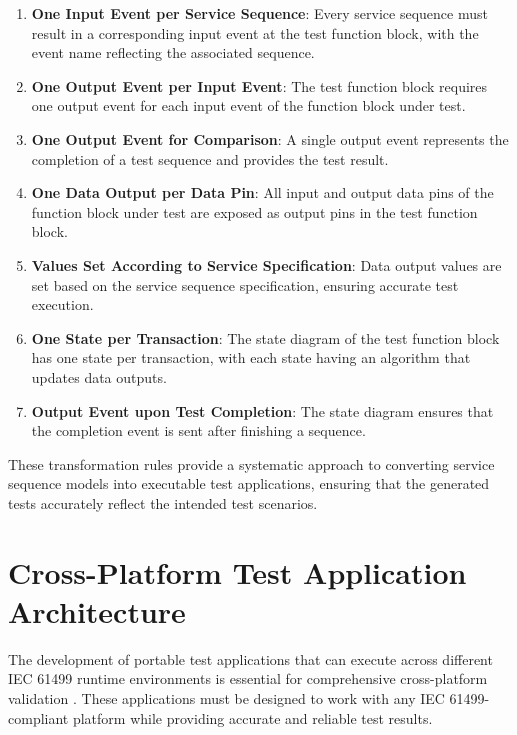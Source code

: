 \begin{enumerate}
    \item \textbf{One Input Event per Service Sequence}: Every service sequence must result in a corresponding input event at the test function block, with the event name reflecting the associated sequence.
    
    \item \textbf{One Output Event per Input Event}: The test function block requires one output event for each input event of the function block under test.
    
    \item \textbf{One Output Event for Comparison}: A single output event represents the completion of a test sequence and provides the test result.
    
    \item \textbf{One Data Output per Data Pin}: All input and output data pins of the function block under test are exposed as output pins in the test function block.
    
    \item \textbf{Values Set According to Service Specification}: Data output values are set based on the service sequence specification, ensuring accurate test execution.
    
    \item \textbf{One State per Transaction}: The state diagram of the test function block has one state per transaction, with each state having an algorithm that updates data outputs.
    
    \item \textbf{Output Event upon Test Completion}: The state diagram ensures that the completion event is sent after finishing a sequence.
\end{enumerate}

These transformation rules provide a systematic approach to converting service sequence models into executable test applications, ensuring that the generated tests accurately reflect the intended test scenarios.

\section{Cross-Platform Test Application Architecture}

The development of portable test applications that can execute across different IEC 61499 runtime environments is essential for comprehensive cross-platform validation \cite{christensen.2012}. These applications must be designed to work with any IEC 61499-compliant platform while providing accurate and reliable test results.

